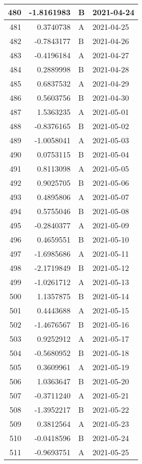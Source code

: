 \begin{tabular}{r|r|l|l}
\hline
480 & -1.8161983 & B & 2021-04-24\\
\hline
481 & 0.3740738 & A & 2021-04-25\\
\hline
482 & -0.7843177 & B & 2021-04-26\\
\hline
483 & -0.4196184 & A & 2021-04-27\\
\hline
484 & 0.2889998 & B & 2021-04-28\\
\hline
485 & 0.6837532 & A & 2021-04-29\\
\hline
486 & 0.5603756 & B & 2021-04-30\\
\hline
487 & 1.5363235 & A & 2021-05-01\\
\hline
488 & -0.8376165 & B & 2021-05-02\\
\hline
489 & -1.0058041 & A & 2021-05-03\\
\hline
490 & 0.0753115 & B & 2021-05-04\\
\hline
491 & 0.8113098 & A & 2021-05-05\\
\hline
492 & 0.9025705 & B & 2021-05-06\\
\hline
493 & 0.4895806 & A & 2021-05-07\\
\hline
494 & 0.5755046 & B & 2021-05-08\\
\hline
495 & -0.2840377 & A & 2021-05-09\\
\hline
496 & 0.4659551 & B & 2021-05-10\\
\hline
497 & -1.6985686 & A & 2021-05-11\\
\hline
498 & -2.1719849 & B & 2021-05-12\\
\hline
499 & -1.0261712 & A & 2021-05-13\\
\hline
500 & 1.1357875 & B & 2021-05-14\\
\hline
501 & 0.4443688 & A & 2021-05-15\\
\hline
502 & -1.4676567 & B & 2021-05-16\\
\hline
503 & 0.9252912 & A & 2021-05-17\\
\hline
504 & -0.5680952 & B & 2021-05-18\\
\hline
505 & 0.3609961 & A & 2021-05-19\\
\hline
506 & 1.0363647 & B & 2021-05-20\\
\hline
507 & -0.3711240 & A & 2021-05-21\\
\hline
508 & -1.3952217 & B & 2021-05-22\\
\hline
509 & 0.3812564 & A & 2021-05-23\\
\hline
510 & -0.0418596 & B & 2021-05-24\\
\hline
511 & -0.9693751 & A & 2021-05-25\\

\end{tabular}
